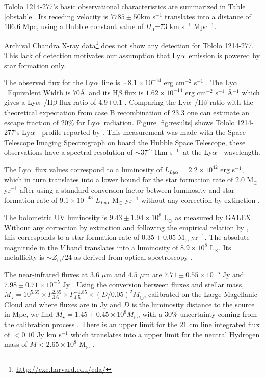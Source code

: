 \documentclass[a4paper,fleqn,usenatbib]{mnras}
\newcommand{\tol}{Tololo 1214-277}
\newcommand{\lya}{\ifmmode{{\rm Ly}\alpha}\else Ly$\alpha$\ \fi}
\newcommand{\kms}{\ifmmode\mathrm{km\ s}^{-1}\else km s$^{-1}$\fi}
\begin{document}
\tol's basic observational characteristics are summarized in Table \ref{obstable}.
Its receding velocity is $7785\pm 50$km s$^{-1}$ translates
into a distance of $106.6$ Mpc, using a Hubble constant value of $H_{0}$=73
km s$^{-1}$ Mpc$^{-1}$.

Archival Chandra X-ray data\footnote{\url{http://cxc.harvard.edu/cda/}} does not show any
detection for \tol. 
This lack of detection motivates our assumption that \lya emission is
powered by star formation only.

The observed flux for the \lya line is $\sim
8.1\times 10^{-14}$ erg cm$^{-2}$ s$^{-1}$ \citep{Thuan97}.
The \lya Equivalent Width is $70$\AA\ and its H$\beta$ flux is 
$1.62\times 10^{-14}$ erg cm$^{-2}$ s$^{-1}$ \AA$^{-1}$
which gives a \lya/H$\beta$ flux ratio of
4.9$\pm$0.1 \citep{Izotov04}.
Comparing the \lya/H$\beta$ ratio with the theoretical
expectation from case B recombination of $23.3$ \citep{Hummer1987} one
can estimate an escape fraction of $20$\% for \lya radiation.
Figure \ref{fig:results} shows \tol's \lya\ profile reported by
\cite{mashesse03}. This measurement was made with the Space Telescope
Imaging Spectrograph on board the Hubble Space Telescope, these
observations have a spectral resolution of $\sim 37$\kms\ at the
\lya\ wavelength.  

The \lya flux values correspond to a luminosity of
$L_{Ly\alpha}=2.2\times 10^{42}$ erg s$^{-1}$, which in turn
translates  into a lower bound for the star formation rate of $2.0$
M$_{\odot}$ yr$^{-1}$ after using a standard conversion factor between
luminosity and star formation rate of $9.1\times 10^{-43}$
$L_{Ly\alpha}$ M$_{\odot}$ yr$^{-1}$ 
without any
correction by extinction
\citep{Kennicutt98}.


The bolometric UV luminosity is $9.43\pm1.94 \times 10^{8}$
L$_{\odot}$ as measured by GALEX. Without any correction by extinction
and following the empirical relation by \cite{Kennicutt98}, this
corresponds to a star formation rate of $0.35\pm 0.05$ M$_{\odot}$
yr$^{-1}$. 
The absolute magnitude in the $V$ band translates into a luminosity of
$8.9\times 10^{8}$ L$_{\odot}$.  
Its metallicity is $\sim Z_{\odot}/24$ as derived from
optical spectroscopy \citep{Izotov04}. 
%

The near-infrared fluxes at $3.6$ $\mu$m and $4.5$ $\mu$m are
$7.71\pm0.55\times 10^{-5}$ Jy and $7.98\pm0.71\times 10^{-5}$ Jy
\citep{2008ApJ...678..804E}.
Using the conversion between fluxes and
stellar mass, $M_{\star} =
10^{5.65} \times F_{3.6}^{2.85} \times F_{4.5}^{-1.85} \times
(D/0.05)^2 M_{\odot}$,  calibrated on the Large Magellanic Cloud 
and  where fluxes are in Jy and $D$ is the luminosity
distance to the source in Mpc, we find $M_{\star} = 1.45\pm0.45\times 10^{8}
M_{\odot}$, with a $30\%$ uncertainty coming from the calibration
process \citep{2012AJ....143..139E}.  
There is an upper limit for the  $21$ cm line integrated flux of $<0.10$
Jy km s$^{-1}$  which translates into a upper limit for the neutral
Hydrogen mass of $M<2.65\times 10^{8}$ M$_{\odot}$
\citep{pustilnikmartin07}. 
\end{document}
